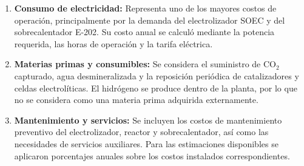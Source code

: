 \documentclass[11pt,letterpaper]{article}
\begin{document}
\begin{enumerate}
    \item \textbf{Consumo de electricidad:}
    Representa uno de los mayores costos de operación,
    principalmente por la demanda del electrolizador
    SOEC y del sobrecalentador E-202. Su costo anual
    se calculó mediante la potencia requerida,
    las horas de operación y la tarifa eléctrica.

    \item \textbf{Materias primas y consumibles:}
    Se considera el suministro de CO$_2$ capturado,
    agua desmineralizada y la reposición periódica
    de catalizadores y celdas electrolíticas.
    El hidrógeno se produce dentro de la planta,
    por lo que no se considera como una materia
    prima adquirida externamente.

    \item \textbf{Mantenimiento y servicios:}
    Se incluyen los costos de mantenimiento
    preventivo del electrolizador, reactor y
    sobrecalentador, así como las necesidades
    de servicios auxiliares. Para las estimaciones
    disponibles se aplicaron porcentajes anuales
    sobre los costos instalados correspondientes.
\end{enumerate}
\end{document}
